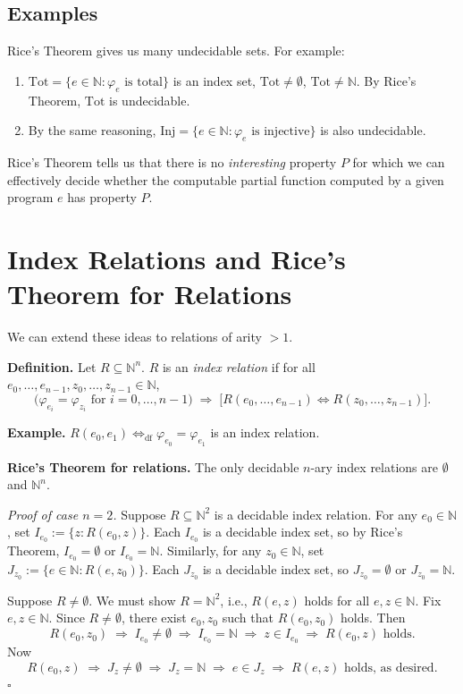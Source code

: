 \documentclass[11pt]{article}
\begin{document}
\subsection{Examples}

Rice's Theorem gives us many undecidable sets. For example:

\begin{enumerate}[leftmargin=1.8em, label=\arabic*)]
    \item $\mathrm{Tot} = \{ e \in \mathbb{N} : \varphi_e \text{ is total} \}$ is an index set, $\mathrm{Tot} \neq \emptyset$, $\mathrm{Tot} \neq \mathbb{N}$. By Rice's Theorem, $\mathrm{Tot}$ is undecidable.
    \item By the same reasoning, $\mathrm{Inj} = \{ e \in \mathbb{N} : \varphi_e \text{ is injective} \}$ is also undecidable.
\end{enumerate}

Rice's Theorem tells us that there is no \emph{interesting} property $P$ for which we can effectively decide whether the computable partial function computed by a given program $e$ has property $P$.

\section{Index Relations and Rice's Theorem for Relations}

We can extend these ideas to relations of arity $> 1$.

\textbf{Definition.} Let $R \subseteq \mathbb{N}^n$. $R$ is an \emph{index relation} if for all $e_0, \ldots, e_{n-1}, z_0, \ldots, z_{n-1} \in \mathbb{N}$,
\[
    \bigl(\varphi_{e_i} = \varphi_{z_i} \text{ for } i = 0, \ldots, n-1\bigr) \;\Rightarrow\; \bigl[R(e_0, \ldots, e_{n-1}) \Leftrightarrow R(z_0, \ldots, z_{n-1})\bigr].
\]

\textbf{Example.} $R(e_0, e_1) \Leftrightarrow_{\mathrm{df}} \varphi_{e_0} = \varphi_{e_1}$ is an index relation.

\textbf{Rice's Theorem for relations.} The only decidable $n$-ary index relations are $\emptyset$ and $\mathbb{N}^n$.

\textit{Proof of case $n=2$.} Suppose $R \subseteq \mathbb{N}^2$ is a decidable index relation. For any $e_0 \in \mathbb{N}$, set $I_{e_0} := \{ z : R(e_0, z) \}$. Each $I_{e_0}$ is a decidable index set, so by Rice's Theorem, $I_{e_0} = \emptyset$ or $I_{e_0} = \mathbb{N}$. Similarly, for any $z_0 \in \mathbb{N}$, set $J_{z_0} := \{ e \in \mathbb{N} : R(e, z_0) \}$. Each $J_{z_0}$ is a decidable index set, so $J_{z_0} = \emptyset$ or $J_{z_0} = \mathbb{N}$.

Suppose $R \neq \emptyset$. We must show $R = \mathbb{N}^2$, i.e., $R(e,z)$ holds for all $e, z \in \mathbb{N}$. Fix $e, z \in \mathbb{N}$. Since $R \neq \emptyset$, there exist $e_0, z_0$ such that $R(e_0, z_0)$ holds. Then
\[
    R(e_0, z_0) \;\Rightarrow\; I_{e_0} \neq \emptyset \;\Rightarrow\; I_{e_0} = \mathbb{N} \;\Rightarrow\; z \in I_{e_0} \;\Rightarrow\; R(e_0, z) \text{ holds}.
\]
Now
\[
    R(e_0, z) \;\Rightarrow\; J_z \neq \emptyset \;\Rightarrow\; J_z = \mathbb{N} \;\Rightarrow\; e \in J_z \;\Rightarrow\; R(e,z) \text{ holds, as desired}.
\]
\hfill$\square$
\end{document}
